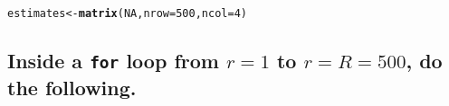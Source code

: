 \documentclass{article}\usepackage[]{graphicx}\usepackage[]{xcolor}
\makeatletter
\newcommand{\hlnum}[1]{\textcolor[rgb]{0.686,0.059,0.569}{#1}}%
\newcommand{\hlstd}[1]{\textcolor[rgb]{0.345,0.345,0.345}{#1}}%
\newcommand{\hlkwb}[1]{\textcolor[rgb]{0.69,0.353,0.396}{#1}}%
\newcommand{\hlkwc}[1]{\textcolor[rgb]{0.333,0.667,0.333}{#1}}%
\newcommand{\hlkwd}[1]{\textcolor[rgb]{0.737,0.353,0.396}{\textbf{#1}}}%
\newenvironment{kframe}{%
 \def\at@end@of@kframe{}%
 \ifinner\ifhmode%
  \def\at@end@of@kframe{\end{minipage}}%
  \begin{minipage}{\columnwidth}%
 \fi\fi%
 \def\FrameCommand##1{\hskip\@totalleftmargin \hskip-\fboxsep
 \colorbox{shadecolor}{##1}\hskip-\fboxsep
     \hskip-\linewidth \hskip-\@totalleftmargin \hskip\columnwidth}%
 \MakeFramed {\advance\hsize-\width
   \@totalleftmargin\z@ \linewidth\hsize
   \@setminipage}}%
 {\par\unskip\endMakeFramed%
 \at@end@of@kframe}
\newenvironment{knitrout}{}{} %
\makeatother
\begin{document}
\begin{knitrout}
\color{fgcolor}\begin{kframe}
\begin{alltt}
\hlstd{estimates} \hlkwb{<-} \hlkwd{matrix}\hlstd{(}\hlnum{NA}\hlstd{,} \hlkwc{nrow} \hlstd{=} \hlnum{500}\hlstd{,} \hlkwc{ncol} \hlstd{=} \hlnum{4}\hlstd{)}
\end{alltt}
\end{kframe}
\end{knitrout}
  
  \subsection{Inside a \texttt{for} loop from $r = 1$ to $r = R = 500$, do the following.}
  
\end{document}
